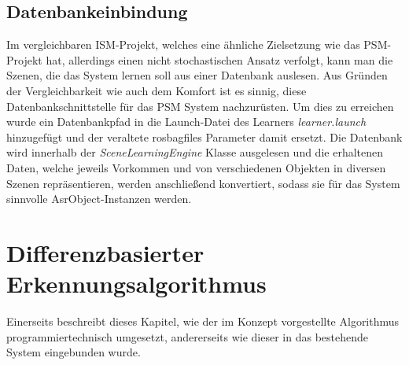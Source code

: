\subsection{Datenbankeinbindung}
Im vergleichbaren ISM-Projekt, welches eine ähnliche Zielsetzung wie das PSM-Projekt hat, allerdings einen nicht stochastischen Ansatz verfolgt, kann man die Szenen, die das System lernen soll aus einer Datenbank auslesen. Aus Gründen der Vergleichbarkeit wie auch dem Komfort ist es sinnig, diese Datenbankschnittstelle für das PSM System nachzurüsten. Um dies zu erreichen wurde ein Datenbankpfad in die Launch-Datei des Learners \textit{learner.launch} hinzugefügt und der veraltete rosbagfiles Parameter damit ersetzt. Die Datenbank wird innerhalb der \textit{SceneLearningEngine} Klasse ausgelesen und die erhaltenen Daten, welche jeweils Vorkommen und von verschiedenen Objekten in diversen Szenen repräsentieren, werden anschließend konvertiert, sodass sie für das System sinnvolle AsrObject-Instanzen werden.\smallskip\\



\section{Differenzbasierter Erkennungsalgorithmus}
Einerseits beschreibt dieses Kapitel, wie der im Konzept vorgestellte Algorithmus programmiertechnisch umgesetzt, andererseits wie dieser in das bestehende System eingebunden wurde. 
